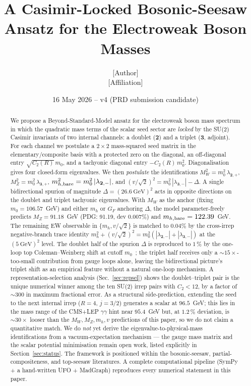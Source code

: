 \documentclass[11pt,a4paper]{article}
\title{A Casimir-Locked Bosonic-Seesaw Ansatz for the Electroweak Boson Masses}
\author{[Author]\\
\small [Affiliation]}
\date{16 May 2026 -- v4 (PRD submission candidate)}
\newcommand{\md}{\mathbf{2}}
\newcommand{\mt}{\mathbf{3}}
\newcommand{\Cas}{C_2}
\begin{document}
\maketitle

\begin{abstract}
We propose a Beyond-Standard-Model ansatz for the electroweak boson mass
spectrum in which the quadratic mass terms of the scalar seed sector are
\emph{locked} by the SU(2) Casimir invariants of two internal channels: a
doublet ($\md$) and a triplet ($\mt$, adjoint). For each channel we
postulate a $2\times 2$ mass-squared seed matrix in the
elementary/composite basis with a protected zero on the diagonal, an
off-diagonal entry $\sqrt{\Cas(R)}\,m_0$, and a tachyonic diagonal entry
$-\Cas(R)\, m_0^2$. Diagonalisation gives four closed-form eigenvalues.
We then \emph{postulate} the identifications
$M_W^2 = m_0^2\,\lambda_{\md,+}$, $M_Z^2 = m_0^2\,\lambda_{\mt,+}$,
$m_{h,{\rm bare}}^2 = m_0^2\,|\lambda_{\md,-}|$, and
$(v/\sqrt{2})^2 = m_0^2\,|\lambda_{\mt,-}| - \Delta$. A single
bidirectional spurion of magnitude $\Delta = (26.6~\text{GeV})^2$ acts
in opposite directions on the doublet and triplet tachyonic
eigenvalues. With $M_W$ as the anchor (fixing $m_0 = 106.57$~GeV) and
either $m_h$ or $G_F$ anchoring $\Delta$, the model parameter-freely
predicts $M_Z = 91.18$~GeV (PDG: 91.19, dev $0.007\%$) and
$m_{h,{\rm bare}} = 122.39$~GeV. The remaining EW observable in
$\{m_h, v/\sqrt{2}\}$ is matched to $0.04\%$ by the cross-irrep
negative-branch trace identity $m_h^2 + (v/\sqrt{2})^2 =
m_0^2(|\lambda_{\md,-}| + |\lambda_{\mt,-}|)$ at the
$(5~\text{GeV})^2$ level. The doublet half of the spurion $\Delta$
is reproduced to $1\,\%$ by the one-loop top Coleman--Weinberg
shift at cutoff $m_0$~\cite{ColemanWeinberg1973, Haba2016BosonicSeesaw};
the triplet half receives only a $\sim\!15\times$-too-small contribution
from gauge loops alone, leaving the bidirectional picture's triplet
shift as an empirical feature without a natural one-loop mechanism. A representation-selection
analysis (Sec.~\ref{sec:repsel}) shows the doublet--triplet pair is the
unique numerical winner among the ten SU(2) irrep pairs with
$\Cas < 12$, by a factor of $\sim 300$ in maximum fractional error. As
a structural side-prediction, extending the seed to the next internal
irrep ($R = 4$, $j = 3/2$) generates a scalar at $96.5$~GeV; this lies
in the mass range of the CMS+LEP $\gamma\gamma$ hint near $95.4$~GeV
but, at $1.2\,\%$ deviation, is $\sim 30\times$ looser than the
$M_W, M_Z, m_h, v$ predictions of this paper, so we do not claim a
quantitative match. We do \emph{not} yet derive the
eigenvalue-to-physical-mass identifications from a vacuum-expectation
mechanism --- the gauge mass matrix and the scalar potential
minimisation remain open work, listed explicitly in
Section~\ref{sec:status}. The framework is positioned within the
bosonic-seesaw, partial-compositeness, and top-seesaw literatures.
A complete computational pipeline (SymPy + a hand-written UFO +
MadGraph) reproduces every numerical statement in this paper.
\end{abstract}
\end{document}

